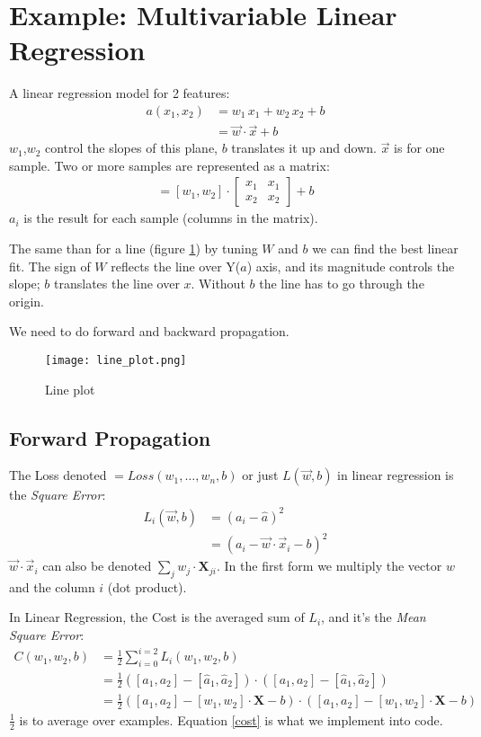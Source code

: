 \section{Example: Multivariable Linear Regression}
A linear regression model for 2 features:
\begin{align*}
  a(x_1, x_2) &= w_1\,x_1 + w_2\,x_2 + b \\
   &= \vec{w}\cdot\vec{x} + b
\end{align*}
$w_1$,$w_2$ control the slopes of this plane, $b$ translates it up and down. $\vec{x}$ is for one sample. Two or more samples are represented as a matrix:
\begin{align*}
[a_1, a_2] = 
  [w_1, w_2]\cdot{}
  \begin{bmatrix}
  x_1 & x_1\\
  x_2 & x_2 
  \end{bmatrix}
 +  b
\end{align*}
$a_i$ is the result for each sample (columns in the matrix).

The same than for a line (figure \ref{fig:line}) by tuning $W$ and $b$  we can find the best linear fit. The sign of $W$ reflects the line over Y($a$) axis, and its magnitude controls the slope; $b$ translates the line over $x$. Without $b$ the line has to go through the origin. 

We need to do forward and backward propagation.
\begin{figure}[h]
 \centering
 \texttt{[image: line\_plot.png]}
  \caption{Line plot} \label{fig:line}
\end{figure}


\subsection{Forward Propagation}
The Loss denoted $= Loss(w_1,\ldots, w_n, b)$ or just $L(\vec{w},b)$ in linear regression is the \textit{Square Error}:
\begin{align*}
  L_i(\vec{w}, b) &= (a_i - \hat{a})^2\\
  &=(a_i -\vec{w}\cdot{}\vec{x}_{i} -b)^2
\end{align*}
$\vec{w}\cdot{}\vec{x}_i$ can also be denoted $\sum_jw_j\cdot{}\mathbf{X}_{ji}$. In the first form we multiply the vector $w$ and the column $i$ (dot product).

In Linear Regression, the Cost is the averaged sum of $L_i$, and it's the \textit{Mean Square Error}:
\begin{align}
  C(w_1, w_2, b) &= \frac{1}{2} \sum_{i=0}^{i=2} L_i(w_1, w_2, b)\nonumber\\
  &= \frac{1}{2}([a_1, a_2] - [\hat{a}_1, \hat{a}_2])\cdot{}([a_1, a_2]-[\hat{a}_1, \hat{a}_2])\nonumber\\
  &=\frac{1}{2}([a_1, a_2] - [w_1, w_2]\cdot{}\mathbf{X}-b)\cdot{}([a_1, a_2] - [w_1,w_2]\cdot{}\mathbf{X} -b) \label{cost}
\end{align}
$\frac{1}{2}$ is to average over examples. Equation \ref{cost} is what we implement into code.

